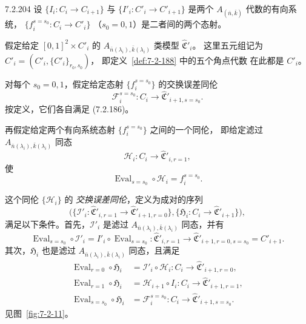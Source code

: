 
\begin{definition}{7.2.204}\label{def:7-2-204}
设 $\{I_i\colon C_i\to C_{i+1}\}$ 与
$\{I'_i\colon C'_i\to C'_{i+1}\}$
是两个 $A_{(\bar n,\bar k)}$ 代数的有向系统，
$\{f_i^{s=s_0}\colon C_i\to C'_i\}$
（$s_0=0,1$）是二者间的两个态射。

假定给定 $[0,1]^2\times C'_i$ 的
$A_{\bar n(\lambda_i),\bar k(\lambda_i)}$ 类模型
$\widehat{\mathfrak C}'_i$。
这里五元组记为
$C'_i=(C'_i,\{C'_i\}_{r_0,s_0})$，
即定义~\ref{def:7-2-188} 中的五个角点代数
在此都是 $C'_i$。

对每个 $s_0=0,1$，假定给定态射
$\{f_i^{s=s_0}\}$ 的交换误差同伦
\[
\mathcal F_i^{s=s_0}\colon C_i\longrightarrow
\widehat{\mathfrak C}'_{i+1,s=s_0}.
\]
按定义，它们各自满足 (7.2.186)。

再假定给定两个有向系统态射
$\{f_i^{s=s_0}\}$ 之间的一个同伦，
即给定滤过
$A_{\bar n(\lambda_i),\bar k(\lambda_i)}$
同态
\[
\mathcal H_i\colon C_i\longrightarrow
\widehat{\mathfrak C}'_{i,r=1},
\]
使
\begin{equation}
\operatorname{Eval}_{s=s_0}\circ\mathcal H_i
=f_i^{s=s_0}.
\tag{7.2.205}\label{eq:7-2-205}
\end{equation}

这个同伦 $\{\mathcal H_i\}$ 的
\emph{交换误差同伦}，定义为成对的序列
\[
\bigl(
\{\mathcal I'_i\colon
\widehat{\mathfrak C}'_{i,r=1}
\to\widehat{\mathfrak C}'_{i+1,r=0}\},
\{\mathfrak H_i\colon C_i\to
\widehat{\mathfrak C}'_{i+1}\}
\bigr),
\]
满足以下条件。首先，$\mathcal I'_i$ 是滤过
$A_{\bar n(\lambda_i),\bar k(\lambda_i)}$
同态，并有
\begin{equation}
\operatorname{Eval}_{s=s_0}\circ\mathcal I'_i
=I'_i\circ\operatorname{Eval}_{s=s_0}
\colon\widehat{\mathfrak C}'_{i,r=1}
\longrightarrow
\widehat{\mathfrak C}'_{i+1,r=0,s=s_0}
=C'_{i+1}.
\tag{7.2.206}\label{eq:7-2-206}
\end{equation}
其次，$\mathfrak H_i$ 也是滤过
$A_{\bar n(\lambda_i),\bar k(\lambda_i)}$
同态，且满足
\begin{align}
\operatorname{Eval}_{r=0}\circ\mathfrak H_i
&=\mathcal I'_i\circ\mathcal H_i
\colon C_i\to
\widehat{\mathfrak C}'_{i+1,r=0},
\tag{7.2.207.1}\label{eq:7-2-207-1}\\
\operatorname{Eval}_{r=1}\circ\mathfrak H_i
&=\mathcal H_{i+1}\circ I_i
\colon C_i\to
\widehat{\mathfrak C}'_{i+1,r=1},
\tag{7.2.207.2}\label{eq:7-2-207-2}\\
\operatorname{Eval}_{s=s_0}\circ\mathfrak H_i
&=\mathcal F_i^{s=s_0}
\colon C_i\to
\widehat{\mathfrak C}'_{i+1,s=s_0}.
\tag{7.2.207.3}\label{eq:7-2-207-3}
\end{align}
见图~\ref{fig:7-2-11}。
\end{definition}

